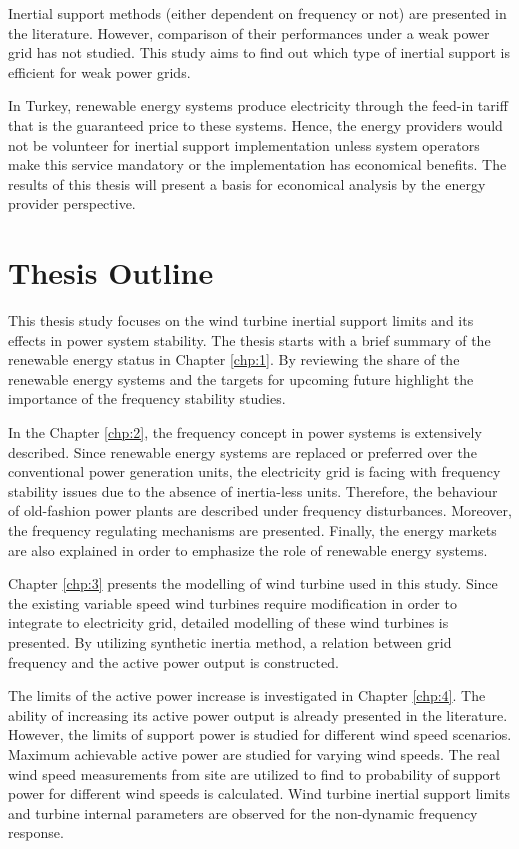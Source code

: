 Inertial support methods (either dependent on frequency or not) are presented in the literature. However, comparison of their performances under a weak power grid has not studied. This study aims to find out which type of inertial support is efficient for weak power grids. \par
In Turkey, renewable energy systems produce electricity through the feed-in tariff that is the guaranteed price to these systems. Hence, the energy providers would not be volunteer for inertial support implementation unless system operators make this service mandatory or the implementation has economical benefits. The results of this thesis will present a basis for economical analysis by the energy provider perspective.
\section{Thesis Outline}
This thesis study focuses on the wind turbine inertial support limits and its effects in power system stability. The thesis starts with a brief summary of the renewable energy status in Chapter \ref{chp:1}. By reviewing the share of the renewable energy systems and the targets for upcoming future highlight the importance of the frequency stability studies.\par
In the Chapter \ref{chp:2}, the frequency concept in power systems is extensively described. Since renewable energy systems are replaced or preferred over the conventional power generation units, the electricity grid is facing with frequency stability issues due to the absence of inertia-less units. Therefore, the behaviour of old-fashion power plants are described under frequency disturbances. Moreover, the frequency regulating mechanisms are presented. Finally, the energy markets are also explained in order to emphasize the role of renewable energy systems.\par
Chapter \ref{chp:3} presents the modelling of wind turbine used in this study. Since the existing variable speed wind turbines require modification in order to integrate to electricity grid, detailed modelling of these wind turbines is presented. By utilizing synthetic inertia method, a relation between grid frequency and the active power output is constructed.\par
The limits of the active power increase is investigated in Chapter \ref{chp:4}. The ability of increasing its active power output is already presented in the literature. However, the limits of support power is studied for different wind speed scenarios. Maximum achievable active power are studied for varying wind speeds. The real wind speed measurements from site are utilized to find to probability of support power for different wind speeds is calculated. Wind turbine inertial support limits and turbine internal parameters are observed for the non-dynamic frequency response.\par
